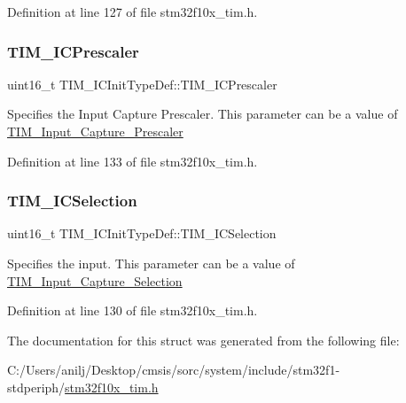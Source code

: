 Definition at line 127 of file stm32f10x\+\_\+tim.\+h.

\mbox{\label{struct_t_i_m___i_c_init_type_def_ac61c7fc999ace295ac81b304cabd61e0}} 
\subsubsection{\texorpdfstring{T\+I\+M\+\_\+\+I\+C\+Prescaler}{TIM\_ICPrescaler}}
{\footnotesize\ttfamily uint16\+\_\+t T\+I\+M\+\_\+\+I\+C\+Init\+Type\+Def\+::\+T\+I\+M\+\_\+\+I\+C\+Prescaler}

Specifies the Input Capture Prescaler. This parameter can be a value of \hyperlink{group___t_i_m___input___capture___prescaler}{T\+I\+M\+\_\+\+Input\+\_\+\+Capture\+\_\+\+Prescaler} 

Definition at line 133 of file stm32f10x\+\_\+tim.\+h.

\mbox{\label{struct_t_i_m___i_c_init_type_def_a00b9a72e895a43dc18c69c96a149f080}} 
\subsubsection{\texorpdfstring{T\+I\+M\+\_\+\+I\+C\+Selection}{TIM\_ICSelection}}
{\footnotesize\ttfamily uint16\+\_\+t T\+I\+M\+\_\+\+I\+C\+Init\+Type\+Def\+::\+T\+I\+M\+\_\+\+I\+C\+Selection}

Specifies the input. This parameter can be a value of \hyperlink{group___t_i_m___input___capture___selection}{T\+I\+M\+\_\+\+Input\+\_\+\+Capture\+\_\+\+Selection} 

Definition at line 130 of file stm32f10x\+\_\+tim.\+h.



The documentation for this struct was generated from the following file\+:\begin{DoxyCompactItemize}
\item 
C\+:/\+Users/anilj/\+Desktop/cmsis/sorc/system/include/stm32f1-\/stdperiph/\hyperlink{stm32f10x__tim_8h}{stm32f10x\+\_\+tim.\+h}\end{DoxyCompactItemize}
